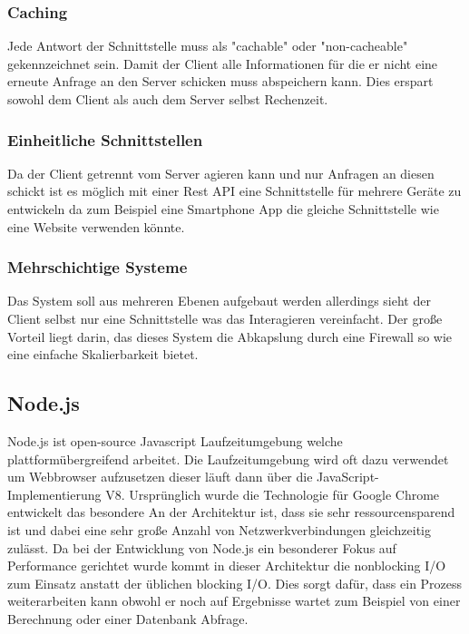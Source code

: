 		 	\subsubsection{Caching}
		 		Jede Antwort der Schnittstelle muss als "cachable" oder "non-cacheable" gekennzeichnet sein. Damit der Client alle Informationen für die er nicht eine erneute Anfrage an den Server schicken muss abspeichern kann. Dies erspart sowohl dem Client als auch dem Server selbst Rechenzeit.
		 	
		 	\subsubsection{Einheitliche Schnittstellen}
		 		Da der Client getrennt vom Server agieren kann und nur Anfragen an diesen schickt ist es möglich mit einer Rest API eine Schnittstelle für mehrere Geräte zu entwickeln da zum Beispiel eine Smartphone App die gleiche Schnittstelle wie eine Website verwenden könnte.
		 	
		 	\subsubsection{Mehrschichtige Systeme}
				Das System soll aus mehreren Ebenen aufgebaut werden allerdings sieht der Client selbst nur eine Schnittstelle was das Interagieren vereinfacht. Der große Vorteil liegt darin, das dieses System die Abkapslung durch eine Firewall so wie eine einfache Skalierbarkeit bietet.
		 	
		 \subsection{Node.js}
		 	Node.js ist open-source Javascript Laufzeitumgebung welche plattformübergreifend arbeitet. Die Laufzeitumgebung wird oft dazu verwendet um Webbrowser aufzusetzen dieser läuft dann über die JavaScript-Implementierung V8. Ursprünglich wurde die Technologie für Google Chrome entwickelt das besondere An der Architektur ist, dass sie sehr ressourcensparend ist und dabei eine sehr große Anzahl von Netzwerkverbindungen gleichzeitig zulässt. Da bei der Entwicklung von Node.js ein besonderer Fokus auf Performance gerichtet wurde kommt in dieser Architektur die nonblocking I/O zum Einsatz anstatt der üblichen blocking I/O. Dies sorgt dafür, dass ein Prozess weiterarbeiten kann obwohl er noch auf Ergebnisse wartet zum Beispiel von einer Berechnung oder einer Datenbank Abfrage. 
		 	
